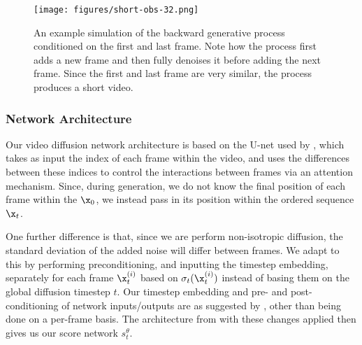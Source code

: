 \begin{figure}
    \centering
    \texttt{[image: figures/short-obs-32.png]}
    \caption{An example simulation of the backward generative process conditioned on the first and last frame. Note how the process first adds a new frame and then fully denoises it before adding the next frame. Since the first and last frame are very similar, the process produces a short video.}
    \label{fig:examplevideoreverse}
\end{figure}




\subsubsection{Network Architecture}
Our video diffusion network architecture is based on the U-net used by \cite{harvey2022flexible}, which takes as input the index of each frame within the video, and uses the differences between these indices to control the interactions between frames via an attention mechanism. Since, during generation, we do not know the final position of each frame within the $\x_0$, we instead pass in its position within the ordered sequence $\x_t$.

One further difference is that, since we are perform non-isotropic diffusion, the standard deviation of the added noise will differ between frames. We adapt to this by performing preconditioning, and inputting the timestep embedding, separately for each frame $\x_t^{(i)}$ based on $\sigma_t(\x_t^{(i)})$ instead of basing them on the global diffusion timestep $t$. Our timestep embedding and pre- and post-conditioning of network inputs/outputs are as suggested by \cite{karraselucidating2022}, other than being done on a per-frame basis. The architecture from \cite{harvey2022flexible} with these changes applied then gives us our score network $s_t^\theta$.

